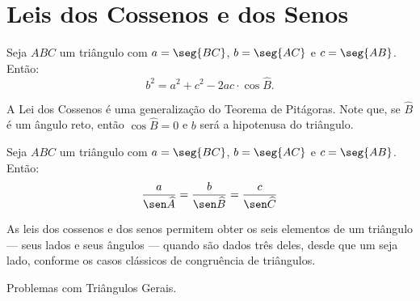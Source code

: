 \section{Leis dos Cossenos e dos Senos}

\begin{theorem}
    Seja $ABC$ um triângulo com $a = \seg {BC}$, $b = \seg {AC}$ e $c = \seg
{AB}$. Então:
$$b^2 = a^2 + c^2 - 2 ac \cdot \cos \widehat B.$$
\end{theorem}

\begin{remark}
    A Lei dos Cossenos é uma generalização do Teorema de Pitágoras. Note
que, se $\widehat B$ é um ângulo reto, então $\cos \widehat B = 0$ e
$b$ será a hipotenusa do triângulo.
\end{remark}

\begin{theorem}
    Seja $ABC$ um triângulo com $a = \seg {BC}$, $b = \seg {AC}$ e $c = \seg
{AB}$. Então:
$$\frac a {\sen \widehat A} = \frac b {\sen \widehat B} = \frac c {\sen \widehat C}$$
\end{theorem}

As leis dos cossenos e dos senos permitem obter os seis elementos de
um triângulo --- seus lados e seus ângulos --- quando são dados três deles, desde que um seja lado,
conforme os casos clássicos de congruência de triângulos.

\begin{onlineact}
    {Problemas com Triângulos Gerais}.
\end{onlineact}